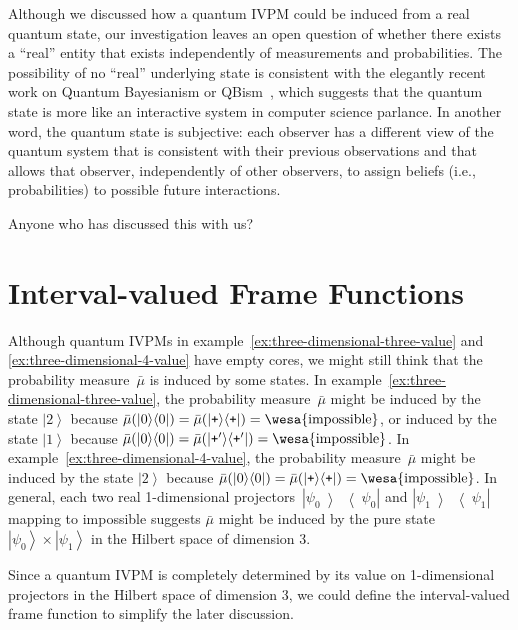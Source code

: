 \documentclass[12pt]{iopart}
\theoremstyle{remark}
\newcommand{\imposs}{{\mbox{\wesa{impossible}}}}
\newcommand{\ket}[1]{{\left\vert{#1}\right\rangle}}
\newcommand{\op}[2]{\ensuremath{\left\vert{#1}\middle\rangle\middle\langle{#2}\right\vert}}
\newcommand{\proj}[1]{\op{#1}{#1}}
\newcommand{\ps}{\texttt{+}}
\begin{document}
Although we discussed how a quantum IVPM could be induced from a real
quantum state, our investigation leaves an open question of whether
there exists a ``real'' entity that exists independently of measurements
and probabilities. The possibility of no ``real'' underlying state
is consistent with the elegantly recent work on Quantum Bayesianism
or QBism~\cite{Fuchs2010,VonBaeyer2016,Fuchs2012}, which suggests
that the quantum state is more like an interactive system in computer
science parlance. In another word, the quantum state is subjective:
each observer has a different view of the quantum system that is consistent
with their previous observations and that allows that observer, independently
of other observers, to assign beliefs (i.e., probabilities) to possible
future interactions.

\ack

Anyone who has discussed this with us?

\appendix

\section{Interval-valued Frame Functions\label{sec:Interval-valued-Frame-Functions}}

Although quantum IVPMs in example~\ref{ex:three-dimensional-three-value}
and \ref{ex:three-dimensional-4-value} have empty cores, we might
still think that the probability measure~$\bar{\mu}$ is induced
by some states. In example~\ref{ex:three-dimensional-three-value},
the probability measure~$\bar{\mu}$ might be induced by the state
$\ket{2}$ because $\bar{\mu}(\proj{0})=\bar{\mu}(\proj{\ps})=\imposs$,
or induced by the state $\ket{1}$ because $\bar{\mu}(\proj{0})=\bar{\mu}(\proj{\ps'})=\imposs$.
In example~\ref{ex:three-dimensional-4-value}, the probability measure~$\bar{\mu}$
might be induced by the state $\ket{2}$ because $\bar{\mu}(\proj{0})=\bar{\mu}(\proj{\ps})=\imposs$.
In general, each two real 1-dimensional projectors~$\proj{\psi_{0}}$
and $\proj{\psi_{1}}$ mapping to impossible suggests $\bar{\mu}$
might be induced by the pure state~$\ket{\psi_{0}}\times\ket{\psi_{1}}$
in the Hilbert space of dimension 3.

Since a quantum IVPM is completely determined by its value on 1-dimensional
projectors in the Hilbert space of dimension 3, we could define the
interval-valued frame function to simplify the later discussion.
\end{document}
